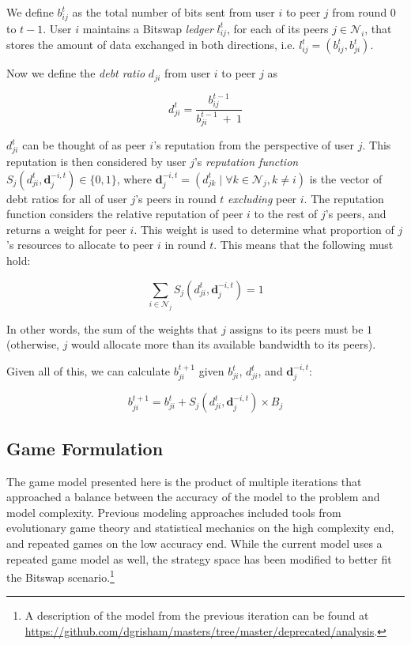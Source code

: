 \documentclass[12pt,letterpaper,]{article}
\newcommand{\Nbhd}[1]{\ensuremath{\mathcal{N}_{#1}}}
\begin{document}
We define \(b_{ij}^t\) as the total number of bits sent from user \(i\)
to peer \(j\) from round \(0\) to \(t-1\). User \(i\) maintains a
Bitswap \emph{ledger} \(l_{ij}^t\), for each of its peers
\(j \in \Nbhd{i}\), that stores the amount of data exchanged in both
directions, i.e. \(l_{ij}^t = (b_{ij}^t, b_{ji}^t)\).

Now we define the \emph{debt ratio} \(d_{ji}\) from user \(i\) to peer
\(j\) as

\[
d_{ji}^t = \frac{b_{ij}^{t-1}}{b_{ji}^{t-1}\:+\:1}
\]

\(d_{ji}^t\) can be thought of as peer \(i\)'s reputation from the
perspective of user \(j\). This reputation is then considered by user
\(j\)'s \emph{reputation function}
\(S_j(d_{ji}^t, \mathbf{d}_j^{-i,t}) \in \{0, 1\}\), where
\(\mathbf{d}_j^{-i,t} = (d_{jk}^t \mid \forall k \in \Nbhd{j}, k \neq i)\)
is the vector of debt ratios for all of user \(j\)'s peers in round
\(t\) \emph{excluding} peer \(i\). The reputation function considers the
relative reputation of peer \(i\) to the rest of \(j\)'s peers, and
returns a weight for peer \(i\). This weight is used to determine what
proportion of \(j\)'s resources to allocate to peer \(i\) in round
\(t\). This means that the following must hold:

\[
\sum_{i \in \Nbhd{j}} S_j(d_{ji}^t, \mathbf{d}_j^{-i,t}) = 1
\]

In other words, the sum of the weights that \(j\) assigns to its peers
must be \(1\) (otherwise, \(j\) would allocate more than its available
bandwidth to its peers).

Given all of this, we can calculate \(b_{ji}^{t+1}\) given \(b_{ji}^t\),
\(d_{ji}^t\), and \(\mathbf{d}_j^{-i,t}\):

\[
b_{ji}^{t+1} = b_{ji}^{t} + S_j(d_{ji}^t, \mathbf{d}_j^{-i,t}) \times B_j
\]

\hypertarget{game-formulation}{%
\subsection{Game Formulation}\label{game-formulation}}

The game model presented here is the product of multiple iterations that
approached a balance between the accuracy of the model to the problem
and model complexity. Previous modeling approaches included tools from
evolutionary game theory and statistical mechanics on the high
complexity end, and repeated games on the low accuracy end. While the
current model uses a repeated game model as well, the strategy space has
been modified to better fit the Bitswap scenario.\footnote{A description
  of the model from the previous iteration can be found at
  \url{https://github.com/dgrisham/masters/tree/master/deprecated/analysis}.}
\end{document}
